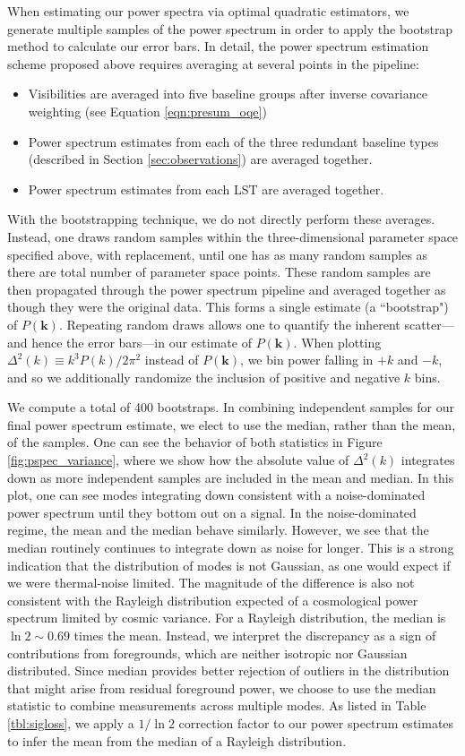 \documentclass[twocolumn,numberedappendix]{emulateapj} \shorttitle{PSA64}
\begin{document}
When estimating our power spectra via optimal quadratic estimators, we generate
multiple samples of the power spectrum in order to apply the bootstrap method to
calculate our error bars. In detail, the power spectrum estimation scheme proposed
above requires averaging at several points in the pipeline:
\begin{itemize}
\item Visibilities are averaged into five baseline groups after inverse covariance weighting (see Equation \eqref{eqn:presum_oqe})
\item Power spectrum estimates from each of the three redundant baseline types (described in Section \ref{sec:observations}) are averaged together.
\item Power spectrum estimates from each LST are averaged together.
\end{itemize}
With the bootstrapping technique, we do not directly perform these averages. Instead,
one draws random samples within the three-dimensional parameter space specified above,
with replacement, until one has as many random samples as there are total number of parameter
space points. These random samples are then propagated through the power spectrum pipeline
and averaged together as though they were the original data. This forms a single estimate (a ``bootstrap") of $P(\mathbf{k})$. Repeating 
random draws allows one to quantify the inherent scatter---and hence the error bars---in our
estimate of $P(\mathbf{k})$. When plotting $\Delta^2 (k) \equiv k^3 P(k) / 2 \pi^2$ instead of
$P(\mathbf{k})$, we bin power falling in $+k$ and $-k$, and so 
we additionally randomize the inclusion of 
positive and negative $k$ bins.

We compute a total of 400 bootstraps. In combining independent samples for our final power spectrum
estimate, we elect to use the median, rather than the mean, of the samples. One can see the behavior 
of both statistics in Figure \ref{fig:pspec_variance}, where we
show how the absolute value of $\Delta^2(k)$ integrates down as more independent samples are included in the mean and median.
In this plot, one can see modes integrating down 
consistent with a noise-dominated power spectrum until they bottom out on a signal.
In the noise-dominated regime, the mean and the median
behave similarly.  However, we see that the median routinely continues to integrate down as noise for longer.
This is a strong indication that the distribution of modes is not Gaussian, as one would expect
if we were thermal-noise limited.  The magnitude of the difference
is also not consistent with the Rayleigh distribution expected of a cosmological power spectrum limited by cosmic
variance.  
For a Rayleigh distribution, the median is $\ln2 \sim 0.69$ times the mean. 
Instead, we interpret the discrepancy as a sign of contributions from foregrounds, which are neither isotropic 
nor Gaussian distributed.  Since median provides 
better rejection of outliers in the distribution that might arise from residual foreground power, we choose to use
the median statistic to combine measurements across multiple modes.
As listed in Table \ref{tbl:sigloss}, we apply a $1/\ln2$ correction factor to our power spectrum estimates to 
infer the mean from the median of a Rayleigh distribution.
\end{document}
